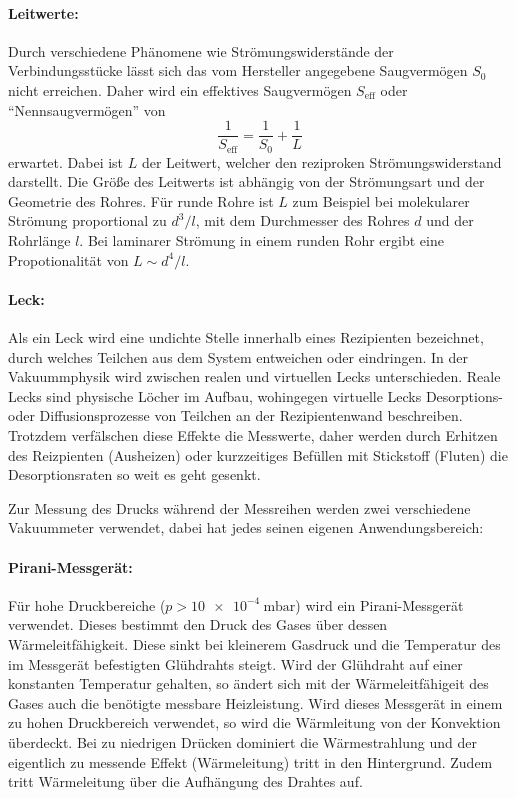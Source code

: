 \paragraph{Leitwerte:}
Durch verschiedene Phänomene wie Strömungswiderstände der Verbindungsstücke
lässt sich das vom Hersteller angegebene Saugvermögen $S_0$ nicht erreichen.
Daher wird ein effektives Saugvermögen $S_\text{eff}$ oder \enquote{Nennsaugvermögen} von
\begin{equation}
   \frac{1}{S_\text{eff}} = \frac{1}{S_0} + \frac{1}{L}
   \label{eqn:effSaug}
\end{equation}
erwartet.
Dabei ist $L$ der Leitwert, welcher den reziproken Strömungswiderstand darstellt.
Die Größe des Leitwerts ist abhängig von der Strömungsart und der Geometrie
des Rohres.
Für runde Rohre ist $L$ zum Beispiel bei molekularer Strömung proportional zu
$d^3 /l$, mit dem Durchmesser des Rohres $d$ und der Rohrlänge $l$.
Bei laminarer Strömung in einem runden Rohr ergibt eine Propotionalität von
$L \sim d^4 / l$.

\paragraph{Leck:}
Als ein Leck wird eine undichte Stelle innerhalb eines Rezipienten bezeichnet,
durch welches Teilchen aus dem System entweichen oder eindringen.
In der Vakuummphysik wird zwischen realen und virtuellen Lecks unterschieden.
Reale Lecks sind physische Löcher im Aufbau,
wohingegen virtuelle Lecks Desorptions- oder Diffusionsprozesse von Teilchen an der
Rezipientenwand beschreiben.
Trotzdem verfälschen diese Effekte die Messwerte,
daher werden durch Erhitzen des Reizpienten (Ausheizen)
oder kurzzeitiges Befüllen mit Stickstoff (Fluten) die Desorptionsraten so weit es geht gesenkt.

Zur Messung des Drucks während der Messreihen werden zwei verschiedene Vakuummeter verwendet,
dabei hat jedes seinen eigenen Anwendungsbereich:

\paragraph{Pirani-Messgerät:}
Für hohe Druckbereiche ($p > \SI{10e-4}{\milli\bar}$) wird ein Pirani-Messgerät verwendet.
Dieses bestimmt den Druck des Gases über dessen Wärmeleitfähigkeit.
Diese sinkt bei kleinerem Gasdruck und die Temperatur des im Messgerät befestigten Glühdrahts steigt.
Wird der Glühdraht auf einer konstanten Temperatur gehalten,
so ändert sich mit der Wärmeleitfähigeit des Gases auch die benötigte messbare Heizleistung.
Wird dieses Messgerät in einem zu hohen Druckbereich verwendet,
so wird die Wärmleitung von der Konvektion überdeckt.
Bei zu niedrigen Drücken dominiert die Wärmestrahlung
und der eigentlich zu messende Effekt (Wärmeleitung) tritt in den Hintergrund.
Zudem tritt Wärmeleitung über die Aufhängung des Drahtes auf.

